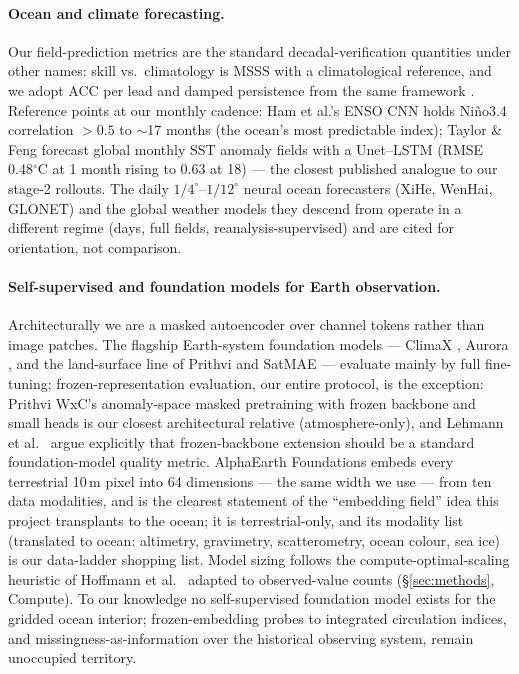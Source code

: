 \documentclass[10pt]{article}
\begin{document}
\paragraph{Ocean and climate forecasting.} Our field-prediction
metrics are the standard decadal-verification quantities under other
names: skill vs.\ climatology is MSSS with a climatological reference,
and we adopt ACC per lead and damped persistence from the same
framework \cite{goddard}. Reference points at our monthly cadence:
Ham et al.'s ENSO CNN \cite{ham} holds Ni\~no3.4 correlation $>0.5$ to
$\sim$17 months (the ocean's most predictable index); Taylor \& Feng
\cite{taylorfeng} forecast global monthly SST anomaly fields with a
Unet--LSTM (RMSE 0.48$^\circ$C at 1 month rising to 0.63 at 18) ---
the closest published analogue to our stage-2 rollouts. The daily
$1/4^\circ$--$1/12^\circ$ neural ocean forecasters (XiHe, WenHai,
GLONET) and the global weather models they descend from
\cite{pangu,graphcast} operate in a different regime (days, full
fields, reanalysis-supervised) and are cited for orientation, not
comparison.

\paragraph{Self-supervised and foundation models for Earth
observation.} Architecturally we are a masked autoencoder \cite{mae}
over channel tokens rather than image patches. The flagship
Earth-system foundation models --- ClimaX \cite{climax}, Aurora
\cite{aurora}, and the land-surface line of Prithvi \cite{prithvi} and
SatMAE \cite{satmae} --- evaluate mainly by full fine-tuning;
frozen-representation evaluation, our entire protocol, is the
exception: Prithvi WxC's anomaly-space masked pretraining with frozen
backbone and small heads is our closest architectural relative
(atmosphere-only), and Lehmann et al.\ \cite{lehmann} argue explicitly
that frozen-backbone extension should be a standard foundation-model
quality metric. AlphaEarth Foundations \cite{alphaearth} embeds every
terrestrial 10\,m pixel into 64 dimensions --- the same width we use
--- from ten data modalities, and is the clearest statement of the
``embedding field'' idea this project transplants to the ocean; it is
terrestrial-only, and its modality list (translated to ocean:
altimetry, gravimetry, scatterometry, ocean colour, sea ice) is our
data-ladder shopping list. Model sizing follows the
compute-optimal-scaling heuristic of Hoffmann et al.\ \cite{chinchilla}
adapted to observed-value counts (\S\ref{sec:methods}, Compute). To our
knowledge no self-supervised foundation model exists for the gridded
ocean interior; frozen-embedding probes to integrated circulation
indices, and missingness-as-information over the historical observing
system, remain unoccupied territory.
\end{document}
